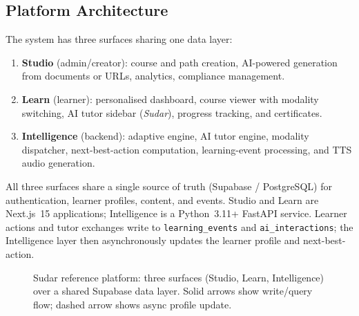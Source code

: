 \documentclass[10pt,twocolumn]{article}
\begin{document}
\subsection{Platform Architecture}
\label{sec:arch}

The system has three surfaces sharing one data layer:

\begin{enumerate}
  \item \textbf{Studio} (admin/creator): course and path creation,
    AI-powered generation from documents or URLs, analytics, compliance
    management.
  \item \textbf{Learn} (learner): personalised dashboard, course viewer
    with modality switching, AI tutor sidebar (\textit{Sudar}), progress
    tracking, and certificates.
  \item \textbf{Intelligence} (backend): adaptive engine, AI tutor
    engine, modality dispatcher, next-best-action computation,
    learning-event processing, and TTS audio generation.
\end{enumerate}

All three surfaces share a single source of truth (Supabase /
PostgreSQL) for authentication, learner profiles, content, and events.
Studio and Learn are Next.js~15 applications; Intelligence is a
Python~3.11+ FastAPI service. Learner actions and tutor exchanges write
to \texttt{learning\_events} and \texttt{ai\_interactions}; the
Intelligence layer then asynchronously updates the learner profile and
next-best-action.

\begin{figure}[b]
\centering
{}
\caption{Sudar reference platform: three surfaces (Studio, Learn,
Intelligence) over a shared Supabase data layer. Solid arrows show
write/query flow; dashed arrow shows async profile update.}
\label{fig:arch}
\end{figure}
\end{document}
